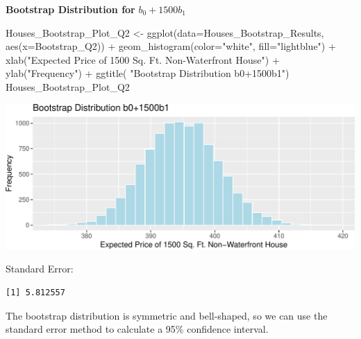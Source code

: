 \documentclass[
  letterpaper,
  DIV=11,
  numbers=noendperiod]{scrreprt}
\newenvironment{Shaded}{\begin{snugshade}}{\end{snugshade}}
\newcommand{\AttributeTok}[1]{\textcolor[rgb]{0.40,0.45,0.13}{#1}}
\newcommand{\FunctionTok}[1]{\textcolor[rgb]{0.28,0.35,0.67}{#1}}
\newcommand{\NormalTok}[1]{\textcolor[rgb]{0.00,0.23,0.31}{#1}}
\newcommand{\OtherTok}[1]{\textcolor[rgb]{0.00,0.23,0.31}{#1}}
\newcommand{\SpecialCharTok}[1]{\textcolor[rgb]{0.37,0.37,0.37}{#1}}
\newcommand{\StringTok}[1]{\textcolor[rgb]{0.13,0.47,0.30}{#1}}
\begin{document}
\textbf{Bootstrap Distribution for} \(b_0 + 1500b_1\)

\begin{Shaded}
\begin{Highlighting}[]
\NormalTok{Houses\_Bootstrap\_Plot\_Q2 }\OtherTok{\textless{}{-}} \FunctionTok{ggplot}\NormalTok{(}\AttributeTok{data=}\NormalTok{Houses\_Bootstrap\_Results, }
                                   \FunctionTok{aes}\NormalTok{(}\AttributeTok{x=}\NormalTok{Bootstrap\_Q2)) }\SpecialCharTok{+}  
  \FunctionTok{geom\_histogram}\NormalTok{(}\AttributeTok{color=}\StringTok{"white"}\NormalTok{, }\AttributeTok{fill=}\StringTok{"lightblue"}\NormalTok{) }\SpecialCharTok{+} 
  \FunctionTok{xlab}\NormalTok{(}\StringTok{"Expected Price of 1500 Sq. Ft. Non{-}Waterfront House"}\NormalTok{) }\SpecialCharTok{+} \FunctionTok{ylab}\NormalTok{(}\StringTok{"Frequency"}\NormalTok{) }\SpecialCharTok{+}
  \FunctionTok{ggtitle}\NormalTok{( }\StringTok{"Bootstrap Distribution b0+1500b1"}\NormalTok{) }
\NormalTok{Houses\_Bootstrap\_Plot\_Q2}
\end{Highlighting}
\end{Shaded}

\includegraphics{Ch3_files/figure-pdf/unnamed-chunk-164-1.pdf}

Standard Error:

\begin{Shaded}
\end{Shaded}

\begin{verbatim}
[1] 5.812557
\end{verbatim}

The bootstrap distribution is symmetric and bell-shaped, so we can use
the standard error method to calculate a 95\% confidence interval.
\end{document}
